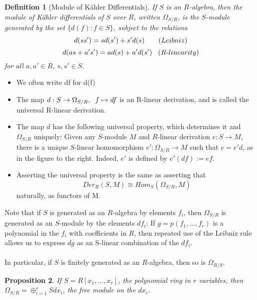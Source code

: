 \documentclass{beamer}
\newtheorem{prop}{Proposition}
\newtheorem{defn}[prop]{Definition}
\newtheorem{n}{Note}
\begin{document}
\begin{frame}
\begin{small}
\begin{defn}[Module of K{\"a}hler Differentials]
If $S$ is an $R$-algebra, then the module of K{\"a}hler differentials of $S$ over $R$, written $\Omega_{S/R}$, is the $S$-module generated by the set $\{d(f):f\in S\}$, subject to the relations 
$$d(ss') = sd(s') + s'd(s) \hspace{7mm} (Leibniz)$$
$$d(as+a's') = ad(s)+a'd(s') \hspace{3mm} (R\text{-}linearity)$$
for all $a,a'\in R$, $s,s'\in S$.
\end{defn}

\begin{itemize}
\item We often write df for d(f)
\item The map $d:S\to\Omega_{S/R},\hspace{2mm} f\mapsto df$ is an R-linear derivation, and is called the universal R-linear derivation. 
\item The map $d$ has the following universal property, which determines it and $\Omega_{S/R}$ uniquely: Given any $S$-module $M$ and $R$-linear derivation $e:S\to M$, there is a unique $S$-linear homomorphism $e':\Omega_{S/R}\to M$ such that $e = e'd$, as in the figure to the right. Indeed, $e'$ is defined by $e'(df) := ef$.
\item Asserting the universal property is the same as asserting that 
$$Der_R(S,M)\cong Hom_S(\Omega_{S/R}, M)$$
naturally, as functors of M.
\end{itemize}
\end{small}
\end{frame}


\begin{frame}
\begin{small}
Note that if $S$ is generated as an $R$-algebra by elements $f_i$, then $\Omega_{S/R}$ is generated as an $S$-module by the elements $df_i$: If $g = p(f_1,...,f_r)$ is a polynomial in the $f_i$ with coefficients in $R$, then repeated use of the Leibniz rule allows us to express $dg$ as an S-linear combination of the $df_i$.
\\\indent
\\In particular, if $S$ is finitely generated as an $R$-algebra, then so is $\Omega_{R/S}$.

\begin{prop}
If $S = R[x_1,...,x_r]$, the polynomial ring in $r$ variables, then $\Omega_{S/R} = \oplus_{i=1}^rSdx_i$, the free module on the $dx_i$.
\end{prop}

\end{small}
\end{frame}
\end{document}
